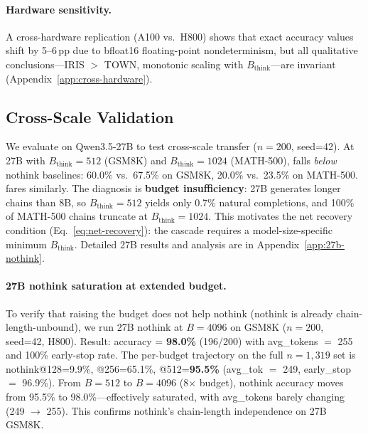 \paragraph{Hardware sensitivity.}
A cross-hardware replication (A100 vs.\ H800) shows that exact accuracy values shift by 5--6\,pp due to bfloat16 floating-point nondeterminism, but all qualitative conclusions---IRIS $>$ TOWN, monotonic scaling with $B_{\text{think}}$---are invariant (Appendix~\ref{app:cross-hardware}).

\subsection{Cross-Scale Validation}
\label{sec:experiments:scale}

We evaluate on Qwen3.5-27B to test cross-scale transfer ($n{=}200$, seed=42).
At 27B with $B_{\text{think}}{=}512$ (GSM8K) and $B_{\text{think}}{=}1024$ (MATH-500), \method{} falls \emph{below} nothink baselines: 60.0\% vs.\ 67.5\% on GSM8K, 20.0\% vs.\ 23.5\% on MATH-500.
\town{} fares similarly.
The diagnosis is \textbf{budget insufficiency}: 27B generates longer chains than 8B, so $B_{\text{think}}{=}512$ yields only 0.7\% natural completions, and 100\% of MATH-500 chains truncate at $B_{\text{think}}{=}1024$.
This motivates the net recovery condition (Eq.~\ref{eq:net-recovery}): the cascade requires a model-size-specific minimum $B_{\text{think}}$.
Detailed 27B results and analysis are in Appendix~\ref{app:27b-nothink}.

\paragraph{27B nothink saturation at extended budget.}
To verify that raising the budget does not help nothink (nothink is already chain-length-unbound), we run 27B nothink at $B{=}4096$ on GSM8K ($n{=}200$, seed=42, H800).
Result: accuracy = \textbf{98.0\%} (196/200) with avg\_tokens $=$ 255 and 100\% early-stop rate.
The per-budget trajectory on the full $n{=}1{,}319$ set is nothink@128{=}9.9\%, @256{=}65.1\%, @512{=}\textbf{95.5\%} (avg\_tok $=$ 249, early\_stop $=$ 96.9\%).
From $B{=}512$ to $B{=}4096$ (8$\times$ budget), nothink accuracy moves from 95.5\% to 98.0\%---effectively saturated, with avg\_tokens barely changing (249 $\to$ 255).
This confirms nothink's chain-length independence on 27B GSM8K.

